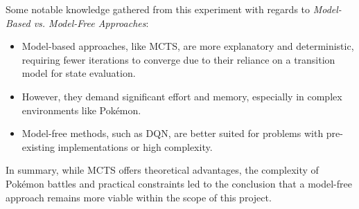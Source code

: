 Some notable knowledge gathered from this experiment with regards to \emph{Model-Based vs. Model-Free Approaches}:
\begin{itemize}
    \item Model-based approaches, like MCTS, are more explanatory and deterministic, requiring fewer iterations to converge due to their reliance on a transition model for state evaluation.
    \item However, they demand significant effort and memory, especially in complex environments like Pokémon.
    \item Model-free methods, such as DQN, are better suited for problems with pre-existing implementations or high complexity.
\end{itemize}

In summary, while MCTS offers theoretical advantages, the complexity of Pokémon battles and practical constraints led to the conclusion that a model-free approach remains more viable within the scope of this project.